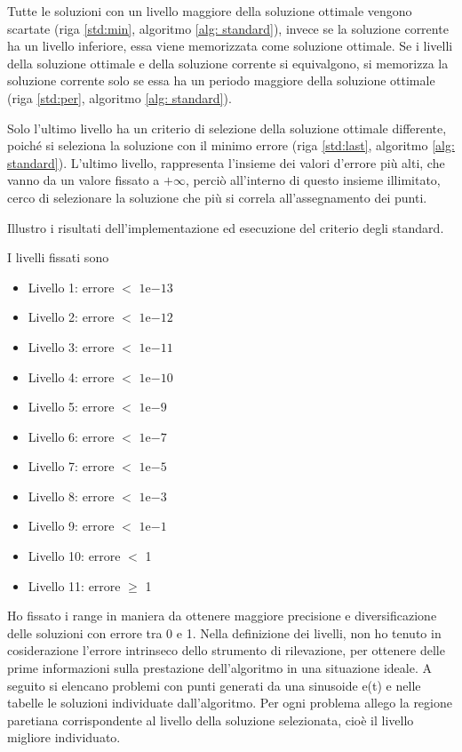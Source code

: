 \documentclass[a4paper,12pt]{report}
\newcommand{\expnumber}[2]{{#1}\mathrm{e}{#2}}
\begin{document}
Tutte le soluzioni con un livello maggiore della soluzione ottimale vengono scartate (riga \ref{std:min}, algoritmo \ref{alg: standard}), invece se la soluzione corrente ha un livello inferiore, essa viene memorizzata come soluzione ottimale. Se i livelli della soluzione ottimale e della soluzione corrente si equivalgono, si memorizza la soluzione corrente solo se essa ha un periodo maggiore della soluzione ottimale (riga \ref{std:per}, algoritmo \ref{alg: standard}).

Solo l'ultimo livello ha un criterio di selezione della soluzione ottimale differente, poiché si seleziona la soluzione con il minimo errore (riga \ref{std:last}, algoritmo \ref{alg: standard}). L'ultimo livello,  rappresenta l'insieme dei valori d'errore più alti, che vanno da un valore fissato a $+\infty$, perciò all'interno di questo insieme illimitato, cerco di selezionare la soluzione che più si correla all'assegnamento dei punti.

Illustro i risultati dell'implementazione ed esecuzione del criterio degli standard.

I livelli fissati sono
\begin{itemize}
  \item Livello 1: errore $<$ $\expnumber{1}{-13}$
  \item Livello 2: errore $<$ $\expnumber{1}{-12}$
  \item Livello 3: errore $<$ $\expnumber{1}{-11}$
  \item Livello 4: errore $<$ $\expnumber{1}{-10}$
  \item Livello 5: errore $<$ $\expnumber{1}{-9}$
  \item Livello 6: errore $<$ $\expnumber{1}{-7}$
  \item Livello 7: errore $<$ $\expnumber{1}{-5}$
  \item Livello 8: errore $<$ $\expnumber{1}{-3}$
  \item Livello 9: errore $<$ $\expnumber{1}{-1}$
  \item Livello 10: errore $<$ 1
  \item Livello 11: errore $\geq$ 1
\end{itemize}

Ho fissato i range in maniera da ottenere maggiore precisione e diversificazione delle soluzioni con errore tra 0 e 1.
Nella definizione dei livelli, non ho tenuto in cosiderazione l'errore intrinseco dello strumento di rilevazione, per ottenere delle prime informazioni sulla prestazione dell'algoritmo in una situazione ideale. A seguito si elencano problemi con punti generati da una sinusoide e(t) e nelle tabelle le soluzioni individuate dall'algoritmo. Per ogni problema allego la regione paretiana corrispondente al livello della soluzione selezionata, cioè il livello migliore individuato.
\end{document}
